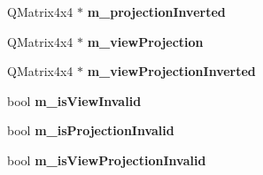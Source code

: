 \begin{DoxyCompactItemize}
\item 
\hypertarget{class_camera_a406e8638e0676defdc5757ed2733e401}{}Q\+Matrix4x4 $\ast$ {\bfseries m\+\_\+projection\+Inverted}\label{class_camera_a406e8638e0676defdc5757ed2733e401}

\item 
\hypertarget{class_camera_a00e4c0e94057379c97e8c71fd69995f7}{}Q\+Matrix4x4 $\ast$ {\bfseries m\+\_\+view\+Projection}\label{class_camera_a00e4c0e94057379c97e8c71fd69995f7}

\item 
\hypertarget{class_camera_a29e1c120c55810920954e335eb60e84e}{}Q\+Matrix4x4 $\ast$ {\bfseries m\+\_\+view\+Projection\+Inverted}\label{class_camera_a29e1c120c55810920954e335eb60e84e}

\item 
\hypertarget{class_camera_a07a7666a3529761624675f4f1771f1c7}{}bool {\bfseries m\+\_\+is\+View\+Invalid}\label{class_camera_a07a7666a3529761624675f4f1771f1c7}

\item 
\hypertarget{class_camera_a62264f74f2fb442e8d94e5c0a44098f0}{}bool {\bfseries m\+\_\+is\+Projection\+Invalid}\label{class_camera_a62264f74f2fb442e8d94e5c0a44098f0}

\item 
\hypertarget{class_camera_a34a4ccea1f4f66eb140db34ef7bdf11a}{}bool {\bfseries m\+\_\+is\+View\+Projection\+Invalid}\label{class_camera_a34a4ccea1f4f66eb140db34ef7bdf11a}

\end{DoxyCompactItemize}
